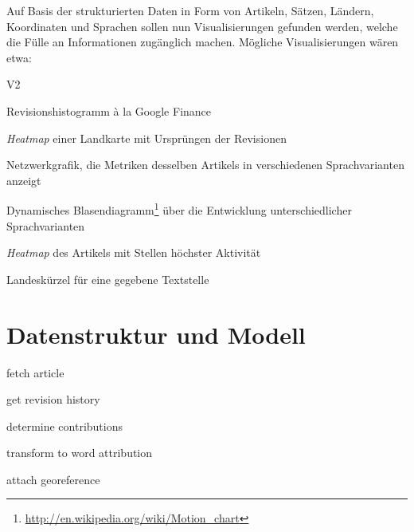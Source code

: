 Auf Basis der strukturierten Daten in Form von Artikeln, Sätzen, Ländern, Koordinaten und Sprachen sollen nun Visualisierungen gefunden werden, welche die Fülle an Informationen zugänglich machen.
Mögliche Visualisierungen wären etwa:

\begin{labeling}{V2}
\item[V1] Revisionshistogramm à la Google Finance 
\item[V2] \emph{Heatmap} einer Landkarte mit Ursprüngen der Revisionen 
\item[V3] Netzwerkgrafik, die Metriken desselben Artikels in verschiedenen Sprachvarianten anzeigt
\item[V4] Dynamisches Blasendiagramm\footnote{\url{http://en.wikipedia.org/wiki/Motion_chart}} über die Entwicklung unterschiedlicher Sprachvarianten
\item[V5] \emph{Heatmap} des Artikels mit Stellen höchster Aktivität 
\item[V6] Landeskürzel für eine gegebene Textstelle
\end{labeling}


\section{Datenstruktur und Modell}

\begin{todos}
    \item fetch article
    \item get revision history
    \item determine contributions
    \item transform to word attribution
    \item attach georeference 
\end{todos}


